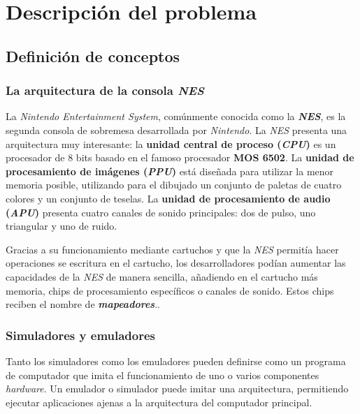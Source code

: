 \chapter{Descripción del problema} \label{ch:descripcion-del-problema}


\section{Definición de conceptos}\label{sec:definicion-de-conceptos}

\subsection{La arquitectura de la consola \textit{NES}}\label{subsec:la-arquitectura-mips}

La \textit{Nintendo Entertainment System}, comúnmente conocida como
la \textbf{\textit{NES}}, es la segunda consola de sobremesa desarrollada por
\textit{Nintendo}.
La \textit{NES} presenta una arquitectura muy interesante:
la \textbf{unidad central de proceso (\textit{CPU})} es un procesador
de 8 bits basado en el famoso procesador \textbf{MOS 6502}\cite{MOS6502}.
La \textbf{unidad de procesamiento de imágenes (\textit{PPU})} está
diseñada para utilizar la menor memoria posible, utilizando para
el dibujado un conjunto de paletas de cuatro colores y un conjunto
de teselas.
La \textbf{unidad de procesamiento de audio (\textit{APU})} presenta
cuatro canales de sonido principales: dos de pulso, uno triangular
y uno de ruido.

\noindent Gracias a su funcionamiento mediante cartuchos y que la
\textit{NES} permitía hacer operaciones se escritura en el cartucho,
los desarrolladores podían aumentar las capacidades de la \textit{NES} de manera sencilla,
añadiendo en el cartucho más memoria, chips de procesamiento específicos
o canales de sonido.
Estos chips reciben el nombre de \textit{\textbf{mapeadores}}.\cite{MAPPERS}.

\subsection{Simuladores y emuladores}
\label{subsec:simuladores-y-emuladores}

Tanto los simuladores como los emuladores pueden definirse como un
programa de computador que imita el funcionamiento de uno o varios
componentes \textit{hardware}.
Un emulador o simulador puede imitar una arquitectura, permitiendo
ejecutar aplicaciones ajenas a la arquitectura del computador principal.


